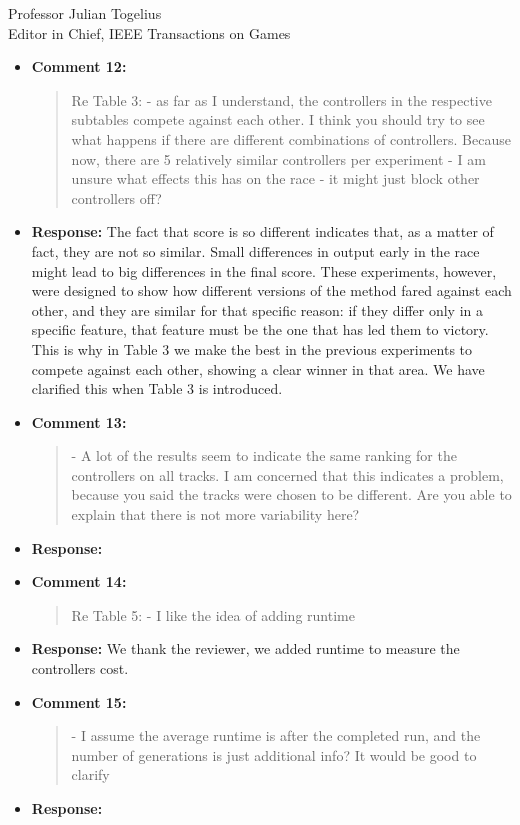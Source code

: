 \documentclass[10pt]{letter} %
\begin{document}
\begin{letter}{Professor Julian Togelius \\ Editor in Chief, IEEE Transactions on Games}
\begin{enumerate}
\begin{itemize}
			\item {\bf Comment 12:}
				\begin{quote}	
					Re Table 3:
					- as far as I understand, the controllers in the respective subtables compete against each other. I think you should try to see what happens if there are different combinations of controllers. Because now, there are 5 relatively similar controllers per experiment - I am unsure what effects this has on the race - it might just block other controllers off?
				\end{quote}
			\item {\bf Response:}
The fact that score is so different indicates that, as a matter of
fact, they are not so similar. Small differences in output early in
the race might lead to big differences in the final score. These
experiments, however, were designed to show how different versions of
the method fared against each other, and they are similar for that
specific reason: if they differ only in a specific feature, that
feature must be the one that has led them to victory. This is why in
Table 3 we make the best in the previous experiments to compete
against each other, showing a clear winner in that area. We have
clarified this when Table 3 is introduced.
			\item {\bf Comment 13:}
				\begin{quote}	
					- A lot of the results seem to indicate the same ranking for the controllers on all tracks. I am concerned that this indicates a problem, because you said the tracks were chosen to be different. Are you able to explain that there is not more variability here?
				\end{quote}	
			\item {\bf Response:} 
			\item {\bf Comment 14:}
				\begin{quote}	
					Re Table 5:
					- I like the idea of adding runtime
				\end{quote}	
			\item {\bf Response:} 
			We thank the reviewer, we added runtime to measure the controllers cost.
			\item {\bf Comment 15:}
				\begin{quote}	
					- I assume the average runtime is after the completed run, and the number of generations is just additional info? It would be good to clarify
				\end{quote}	
			\item {\bf Response:} 

\end{itemize}
\end{enumerate}
\end{letter}
\end{document}
